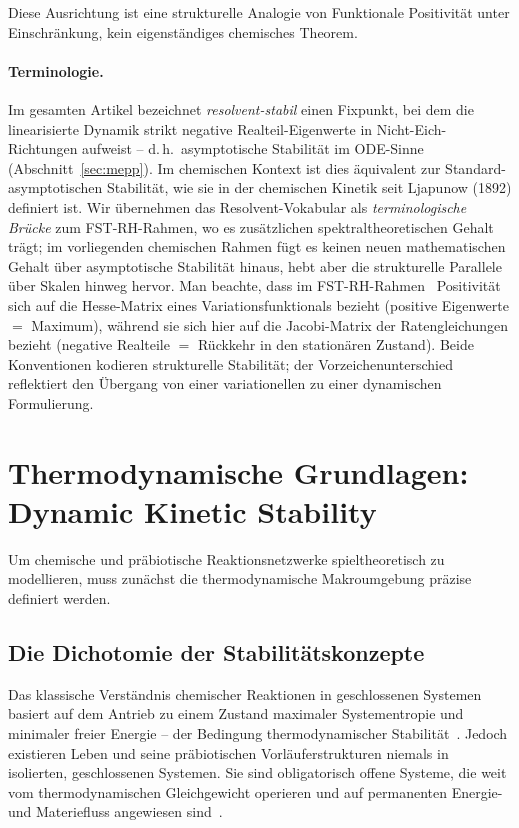 \documentclass[12pt,a4paper]{article}
\theoremstyle{remark}
\begin{document}
Diese Ausrichtung ist eine strukturelle Analogie von \glqq Funktionale Positivität unter Einschränkung\grqq{}, kein eigenständiges chemisches Theorem.

\paragraph{Terminologie.} Im gesamten Artikel bezeichnet \emph{resolvent-stabil} einen Fixpunkt, bei dem die linearisierte Dynamik strikt negative Realteil-Eigenwerte in Nicht-Eich-Richtungen aufweist -- d.\,h.\ asymptotische Stabilität im ODE-Sinne (Abschnitt~\ref{sec:mepp}). Im chemischen Kontext ist dies äquivalent zur Standard-asymptotischen Stabilität, wie sie in der chemischen Kinetik seit Ljapunow (1892) definiert ist. Wir übernehmen das \glqq Resolvent\grqq{}-Vokabular als \emph{terminologische Brücke} zum FST-RH-Rahmen, wo es zusätzlichen spektraltheoretischen Gehalt trägt; im vorliegenden chemischen Rahmen fügt es keinen neuen mathematischen Gehalt über asymptotische Stabilität hinaus, hebt aber die strukturelle Parallele über Skalen hinweg hervor. Man beachte, dass im FST-RH-Rahmen~\citep{GeigerRH2026b} \glqq Positivität\grqq{} sich auf die Hesse-Matrix eines Variationsfunktionals bezieht (positive Eigenwerte $=$ Maximum), während sie sich hier auf die Jacobi-Matrix der Ratengleichungen bezieht (negative Realteile $=$ Rückkehr in den stationären Zustand). Beide Konventionen kodieren strukturelle Stabilität; der Vorzeichenunterschied reflektiert den Übergang von einer variationellen zu einer dynamischen Formulierung.

\section{Thermodynamische Grundlagen: Dynamic Kinetic Stability}
\label{sec:thermodynamics}

Um chemische und präbiotische Reaktionsnetzwerke spieltheoretisch zu modellieren, muss zunächst die thermodynamische Makroumgebung präzise definiert werden.

\subsection{Die Dichotomie der Stabilitätskonzepte}

Das klassische Verständnis chemischer Reaktionen in geschlossenen Systemen basiert auf dem Antrieb zu einem Zustand maximaler Systementropie und minimaler freier Energie -- der Bedingung thermodynamischer Stabilität~\citep{Pross2012}. Jedoch existieren Leben und seine präbiotischen Vorläuferstrukturen niemals in isolierten, geschlossenen Systemen. Sie sind obligatorisch offene Systeme, die weit vom thermodynamischen Gleichgewicht operieren und auf permanenten Energie- und Materiefluss angewiesen sind~\citep{Bioenergetics}.
\end{document}
